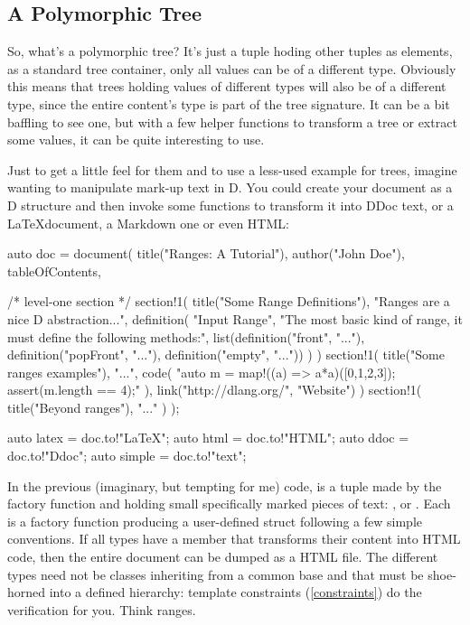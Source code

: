 \subsection{A Polymorphic Tree}\label{polymorphictree}

So, what's a polymorphic tree? It's just a tuple hoding other tuples as elements, as a standard tree container, only all values can be of a different type. Obviously this means that trees holding values of different types will also be of a different type, since the entire content's type is part of the tree signature. It can be a bit baffling to see one, but with a few helper functions to transform a tree or extract some values, it can be quite interesting to use.

Just to get a little feel for them and to use a less-used example for trees, imagine wanting to manipulate mark-up text in D. You could create your document as a D structure and then invoke some functions to transform it into DDoc text, or a \LaTeX document, a Markdown one or even HTML:

\begin{dcode}
auto doc = 
document(
    title("Ranges: A Tutorial"),
    author("John Doe"),
    tableOfContents,
    
    /* level-one section */
    section!1(
        title("Some Range Definitions"),
        "Ranges are a nice D abstraction...",
        definition(
            "Input Range", 
            "The most basic kind of range, it must define the following methods:",
            list(definition("front", "..."),
                 definition("popFront", "..."),
                 definition("empty", "..."))
        )
    )
    section!1(
        title("Some ranges examples"),
        "...",
        code(
            "auto m = map!((a) => a*a)([0,1,2,3]);
             assert(m.length == 4);"
        ),
        link("http://dlang.org/", "Website")
    )
    section!1(
        title("Beyond ranges"),
        "..."
    )
);

auto latex = doc.to!"LaTeX";
auto html = doc.to!"HTML";
auto ddoc = doc.to!"Ddoc";
auto simple = doc.to!"text";
\end{dcode}

In the previous (imaginary, but tempting for me) code,  is a tuple made by the  factory function and holding small specifically marked pieces of text: ,  or . Each is a factory function producing a user-defined struct following a few simple conventions. If all types have a  member that transforms their content into HTML code, then the entire document can be dumped as a HTML file. The different types need not be classes inheriting from a common base and that must be shoe-horned into a defined hierarchy: template constraints (\ref{constraints}) do the verification for you. Think ranges.

